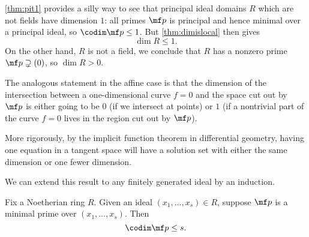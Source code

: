 \begin{remark}[Nir]
	\autoref{thm:pit1} provides a silly way to see that principal ideal domains $R$ which are not fields have dimension $1$: all primes $\mf p$ is principal and hence minimal over a principal ideal, so $\codim\mf p\le1$. But \autoref{thm:dimislocal} then gives
	\[\dim R\le1.\]
	On the other hand, $R$ is not a field, we conclude that $R$ has a nonzero prime $\mf p\supsetneq(0)$, so $\dim R>0$.
\end{remark}
\begin{remark} \label{rem:geometricpit}
	The analogous statement in the affine case is that the dimension of the intersection between a one-dimensional curve $f=0$ and the space cut out by $\mf p$ is either going to be $0$ (if we intersect at points) or $1$ (if a nontrivial part of the curve $f=0$ lives in the region cut out by $\mf p$).
	
	More rigorously, by the implicit function theorem in differential geometry, having one equation in a tangent space will have a solution set with either the same dimension or one fewer dimension.
\end{remark}
We can extend this result to any finitely generated ideal by an induction.
\begin{theorem} \label{thm:pit}
	Fix a Noetherian ring $R$. Given an ideal $(x_1,\ldots,x_s)\in R$, suppose $\mf p$ is a minimal prime over $(x_1,\ldots,x_s)$. Then
	\[\codim\mf p\le s.\]
\end{theorem}
